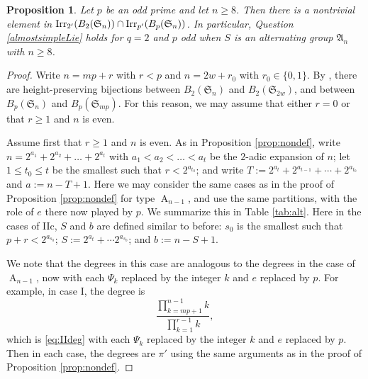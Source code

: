 \documentclass[12pt,leqno,a4paper]{amsart}
\newcommand{\alt}{\mathfrak{A}}
\newcommand{\sym}{\mathfrak{S}}
\def\irrp#1#2{{\rm Irr}_{#1'}(#2)}
\newtheorem{prop}[thm]{Proposition}
\theoremstyle{remark}
\newcommand\type[1]{\operatorname{#1}}
\begin{document}
\begin{prop}\label{prop:alts}
Let $p$ be an odd prime and let $n\geq 8$.  Then there is a nontrivial element in $\irrp{2}{B_2(\sym_n)}\cap\irrp{p}{B_p(\sym_n)}$.  In particular, Question \ref{almostsimpleLie} holds for $q=2$ and $p$ odd when $S$ is an alternating group $\alt_n$ with $n\geq 8$.
\end{prop}
\begin{proof}
  Write $n=mp+r$ with $r<p$ and $n=2w+r_0$ with $r_0\in\{0,1\}$. By \cite[Theorem 1.10]{MO83}, there are height-preserving bijections between $B_2(\sym_n)$ and $B_2(\sym_{2w})$, and between $B_p(\sym_n)$ and $B_p(\sym_{mp})$.  For this reason, we may assume that either $r=0$ or that $r\geq 1$ and $n$ is even. 

Assume first that $r\geq 1$ and $n$ is even.  As in Proposition \ref{prop:nondef}, write  $n=2^{a_1}+2^{a_2}+\ldots+2^{a_t}$ with $a_1<a_2<\ldots<a_t$ be the $2$-adic expansion of $n$; let $1\leq t_0\leq t$ be the smallest such that $r<2^{a_{t_0}}$; and write $T:=2^{a_t}+2^{a_{t-1}}+\cdots +2^{a_{t_0}}$ and $a:=n-T+1$.  %
Here we may consider the same cases as in the proof of Proposition \ref{prop:nondef} for type $\type{A}_{n-1}$, and use the same partitions, with the role of $e$ there now played by $p$.  We summarize this in Table \ref{tab:alt}.  Here in the cases of IIc, $S$ and $b$ are defined similar to before: $s_0$ is the smallest such that $p+r<2^{a_{s_0}}$; $S:=2^{a_t}+\cdots 2^{a_{s_0}}$; and $b:=n-S+1$.

  We note that the degrees in this case are analogous to the degrees in the case of $\type{A}_{n-1}$, now with each $\Psi_k$ replaced by the integer $k$ and $e$ replaced by $p$.  For example, in case I, the degree is \[\frac{\prod_{k=mp+1}^{n-1}k}{\prod_{k=1}^{r-1}k},\] which is \eqref{eq:IIdeg} with each $\Psi_k$ replaced by the integer $k$ and $e$ replaced by $p$.
Then in each case, the degrees are $\pi'$ using the same arguments as in the proof of Proposition \ref{prop:nondef}.  




\end{proof}
\end{document}
